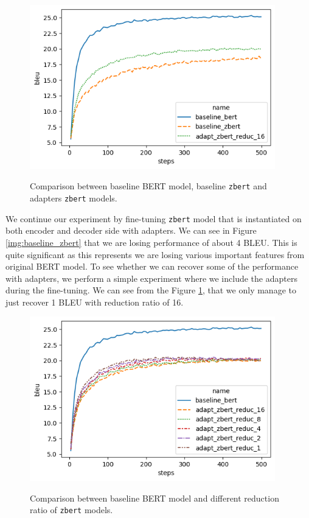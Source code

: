 \begin{figure}[h]
    {\includegraphics[width=0.95\textwidth]{img/adapter_zbert.png}}
    \centering
    \caption{Comparison between baseline BERT model, baseline \texttt{zbert} and adapters \texttt{zbert} models.}
    \label{img:adapter_zbert}
\end{figure}

We continue our experiment by fine-tuning \texttt{zbert} model that is instantiated on both encoder and decoder side with adapters. We can see in Figure \ref{img:baseline_zbert} that we are losing performance of about 4 BLEU. This is quite significant as this represents we are losing various important features from original BERT model. To see whether we can recover some of the performance with adapters, we perform a simple experiment where we include the adapters during the fine-tuning. We can see from the Figure \ref{img:adapter_zbert}, that we only manage to just recover 1 BLEU with reduction ratio of 16.

\begin{figure}[h]
    {\includegraphics[width=0.95\textwidth]{img/adapter_zbert_ratio.png}}
    \centering
    \caption{Comparison between baseline BERT model and different reduction ratio of \texttt{zbert} models.}
    \label{img:adapter_zbert_ratio}
\end{figure}

